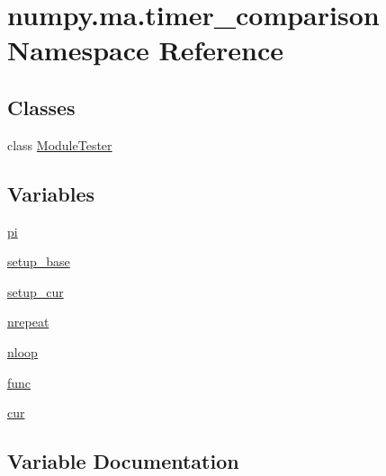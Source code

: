 \hypertarget{namespacenumpy_1_1ma_1_1timer__comparison}{}\section{numpy.\+ma.\+timer\+\_\+comparison Namespace Reference}
\label{namespacenumpy_1_1ma_1_1timer__comparison}
\subsection*{Classes}
\begin{DoxyCompactItemize}
\item 
class \hyperlink{classnumpy_1_1ma_1_1timer__comparison_1_1ModuleTester}{Module\+Tester}
\end{DoxyCompactItemize}
\subsection*{Variables}
\begin{DoxyCompactItemize}
\item 
\hyperlink{namespacenumpy_1_1ma_1_1timer__comparison_ab03c709ca1adf26a588f1cdcea6f5abf}{pi}
\item 
\hyperlink{namespacenumpy_1_1ma_1_1timer__comparison_a253c9f27b41d4e2683cb1d71b57be7e1}{setup\+\_\+base}
\item 
\hyperlink{namespacenumpy_1_1ma_1_1timer__comparison_a49cd1ba653d2a30cf88596922a5eab58}{setup\+\_\+cur}
\item 
\hyperlink{namespacenumpy_1_1ma_1_1timer__comparison_a377b7955b921b53f5c5eb658584fac5d}{nrepeat}
\item 
\hyperlink{namespacenumpy_1_1ma_1_1timer__comparison_ac7e9ca3e2801ff7596eb3fe5eadcc329}{nloop}
\item 
\hyperlink{namespacenumpy_1_1ma_1_1timer__comparison_a284694b8b70bffa1fd16626ce6ac0d63}{func}
\item 
\hyperlink{namespacenumpy_1_1ma_1_1timer__comparison_ad155ccf238cce680c281beed4a9205d9}{cur}
\end{DoxyCompactItemize}


\subsection{Variable Documentation}
\mbox{\label{namespacenumpy_1_1ma_1_1timer__comparison_ad155ccf238cce680c281beed4a9205d9}} 
